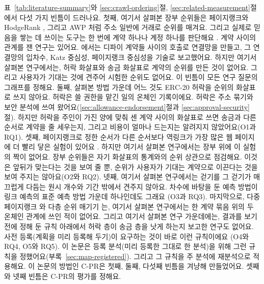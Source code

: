 표~\ref{tab:literature-summary}와 \ref{sec:crawl-ordering}절, \ref{sec:related-measurement}절에서 다섯 가지 빈틈이 드러나요. 첫째, 여기서 살펴본 장부 순위들은 페이지랭크와 HodgeRank \parencite{do2023hodgerank}, 그리고 AWP \parencite{do2023awp}처럼 주소 일반에 거래로 순위를 매겨요. 그리고 실제로 믿음을 쌓는 데 쓰이는 도구는 한 번에 계약 하나나 계정 하나를 판단해요 \parencite{humanpassportnddocs}. 계약 사이의 관계를 잰 연구는 있어요. \textcite{kitzler2023defi}에서는 디파이 계약들 사이의 호출로 연결망을 만들고, 그 연결망의 입차수, Katz 중심성, 페이지랭크 중심성을 기술로 보고했어요. 하지만 여기서 살펴본 연구에서는, 허락 화살표와 송금 화살표로 계약의 순위를 만든 것이 없어요. 그리고 사용자가 기대는 것에 견주어 시험한 순위도 없어요. 이 빈틈이 모든 연구 질문의 그래프를 정해요. 둘째, 살펴본 방법 가운데 어느 것도 ERC-20 허락을 순위의 화살표로 쓰지 않아요. 허락은 쓸 권한을 맡긴 일의 온체인 기록이에요. 허락은 주소 묶기와 보안 분석에 쓰여 왔어요(\ref{sec:allowance-endorsement}절과 \ref{sec:approval-security}절). 하지만 허락을 주인이 가진 양에 맞춰 센 계약 사이의 화살표로 쓰면 송금과 다른 순서로 계약을 줄 세우는지, 그리고 비용이 얼마나 드는지는 알려지지 않았어요(O1과 RQ1). 셋째, 페이지랭크로 정한 순서가 다른 순서보다 역링크가 가장 많은 웹 페이지에 더 빨리 닿은 실험이 있어요 \parencite{cho1998crawling}. 하지만 여기서 살펴본 연구에서는 장부 위에 이 실험의 짝이 없어요. 장부 순위들은 자기 화살표의 통계와의 순위 상관으로 점검해요. 이것은 앞뒤가 맞는다는 것을 보여 줄 뿐, 순위가 사용자가 기대는 계약으로 이끈다는 것을 보여 주지는 않아요(O2와 RQ2). 넷째, 여기서 살펴본 연구에서는 걷기를 그 걷기가 매끄럽게 다듬는 원시 개수와 기간 밖에서 견주지 않아요. 차수에 바탕을 둔 예측 방법이 링크 예측의 표준 예측 방법 가운데 하나인데도 그래요 \parencite{libennowell2007link}(O3과 RQ3). 마지막으로, 다중 페이지랭크 \parencite{halu2013multiplex}와 다층 순위 매기기 \parencite{dedomenico2015ranking}는, 여기서 살펴본 연구에서는 한 계약 묶음 위의 두 온체인 관계에 쓰인 적이 없어요. 그리고 여기서 살펴본 연구 가운데에는, 결과를 보기 전에 정해 둔 규칙 아래에서 허락 층이 송금 층을 낫게 하는지 보고한 연구도 없어요. 사전 등록(계획을 미리 등록해 두기)이 요구하는 것이 바로 이런 규칙이에요 \parencite{nosek2018preregistration}(O4와 RQ4, O5와 RQ5). 이 논문은 등록 분석(미리 등록한 그대로 한 분석)을 위해 그런 규칙을 정했어요(부록~\ref{sec:map-registered}). 그리고 그 규칙을 주 분석에 재분석으로 적용해요. 이 논문의 방법인 \mbox{C-PR}은 첫째, 둘째, 다섯째 빈틈을 겨냥해 만들었어요. 셋째와 넷째 빈틈은 \mbox{C-PR}의 평가를 정해요.


